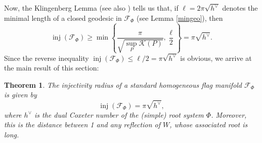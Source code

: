\documentclass[11pt,twoside]{amsart}
\theoremstyle{plain}
\newtheorem{theo}[prop]{Theorem}
\DeclareMathOperator\inj{inj}
\begin{document}
Now, the Klingenberg Lemma \cite[Chapter 13, Proposition 2.13]{do_carmo_riemannian} (see also \cite[Proposition 2.6.8]{klingenberg_riemann}) tells us that, if $\ell=2\pi\sqrt{h^\vee}$ denotes the minimal length of a closed geodesic in $\mathcal{F}_\Phi$ (see Lemma \ref{mingeo}), then
\[\inj(\mathcal{F}_\Phi)\ge\min\left\{\frac{\pi}{\sqrt{\sup_P\mathcal{K}(P)}},\frac{\ell}{2}\right\}=\pi\sqrt{h^\vee}.\]
Since the reverse inequality $\inj(\mathcal{F}_\Phi)\le\ell/2=\pi\sqrt{h^\vee}$ is obvious, we arrive at the main result of this section:
\begin{theo}\label{injrad}
The injectivity radius of a standard homogeneous flag manifold $\mathcal{F}_\Phi$ is given by
\[\inj(\mathcal{F}_\Phi)=\pi\sqrt{h^\vee},\]
where $h^\vee$ is the dual Coxeter number of the (simple) root system $\Phi$. Moreover, this is the distance between 1 and any reflection of $W$, whose associated root is long.
\end{theo}
\end{document}
